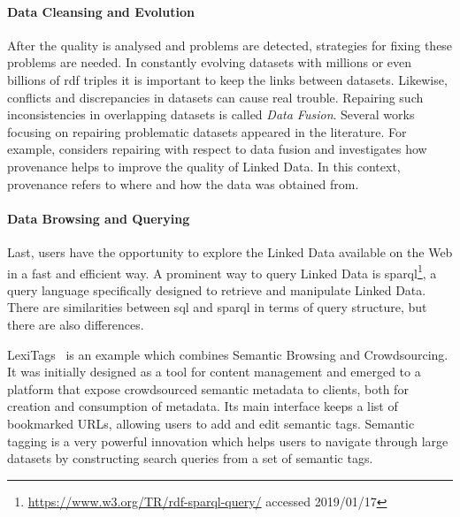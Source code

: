\paragraph{Data Cleansing and Evolution}
After the quality is analysed and problems are detected, strategies for fixing these problems are needed. In constantly evolving datasets with millions or even billions of \gls{rdf} triples it is important to keep the links between datasets. Likewise, conflicts and discrepancies in datasets can cause real trouble. Repairing such inconsistencies in overlapping datasets is called \emph{Data Fusion}. Several works focusing on repairing problematic datasets appeared in the literature. For example, \cite{mendes2012} considers repairing with respect to data fusion and \cite{flouris2012} investigates how provenance helps to improve the quality of Linked Data. In this context, provenance refers to where and how the data was obtained from. 

\paragraph{Data Browsing and Querying}
Last, users have the opportunity to explore the Linked Data available on the Web in a fast and efficient way. A prominent way to query Linked Data is
\gls{sparql}\footnote{\url{https://www.w3.org/TR/rdf-sparql-query/} accessed 2019/01/17}, a query language specifically designed to retrieve and manipulate Linked Data. There are similarities between \gls{sql} and \gls{sparql} in terms of query structure, but there are also differences.

LexiTags~\cite{veres2013} is an example which combines Semantic Browsing and Crowdsourcing. It was initially designed as a tool for content management and emerged to a platform that expose crowdsourced semantic metadata to clients, both for creation and consumption of metadata. Its main interface keeps a list of bookmarked URLs, allowing users to add and edit semantic tags. Semantic tagging is a very powerful innovation which helps users to navigate through large datasets by constructing search queries from a set of semantic tags. 

